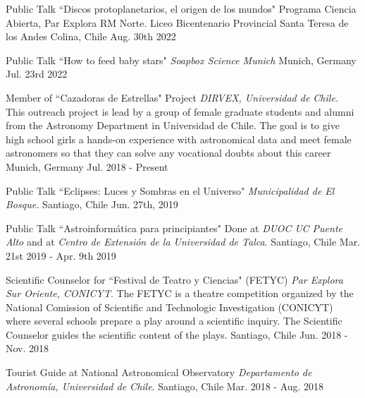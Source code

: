 

\begin{cvhonors}
	\cvhonor
	{Public Talk ``Discos protoplanetarios, el origen de los mundos"} %
	{Programa Ciencia Abierta, Par Explora RM Norte. Liceo Bicentenario Provincial Santa Teresa de los Andes}
	{Colina, Chile} %
	{Aug. 30th 2022} %
	
	\cvhonor
	{Public Talk ``How to feed baby stars"} %
	{\textit{Soapbox Science Munich}} 
	{Munich, Germany} %
	{Jul. 23rd 2022} %
	
	
	\cvhonor
	{Member of ``Cazadoras de Estrellas" Project} %
	{\textit{DIRVEX, Universidad de Chile. }This outreach project is lead by a group of female graduate students and alumni from the Astronomy Department in Universidad de Chile. The goal is to give high school girls a hands-on experience with astronomical data and meet female astronomers so that they can solve any vocational doubts about this career} 
	{Munich, Germany} %
	{Jul. 2018 - Present} %
	
	\cvhonor
	{Public Talk ``Eclipses: Luces y Sombras en el Universo"} %
	{\textit{Municipalidad de El Bosque.} } 
	{Santiago, Chile} %
	{Jun. 27th, 2019} %

	\cvhonor
	{Public Talk ``Astroinform\'atica para principiantes"} %
	{Done at \textit{DUOC UC Puente Alto} and at \textit{Centro de Extensi\'on de la Universidad de Talca}. } 
	{Santiago, Chile} %
	{Mar. 21st 2019 - Apr. 9th 2019} %
	
	\cvhonor
	{Scientific Counselor for ``Festival de Teatro y Ciencias" (FETYC)} %
	{\textit{Par Explora Sur Oriente, CONICYT}. The FETYC is a theatre competition organized by the National Comission of Scientific and Technologic Investigation (CONICYT) where several schools prepare a play around a scientific inquiry. The Scientific Counselor guides the scientific content of the plays.} 
	{Santiago, Chile} %
	{Jun. 2018 - Nov. 2018} %
	
	\cvhonor
	{Tourist Guide at National Astronomical Observatory} %
	{\textit{Departamento de Astronom\'ia, Universidad de Chile}. } 
	{Santiago, Chile} %
	{Mar. 2018 - Aug. 2018} %
	
\end{cvhonors}